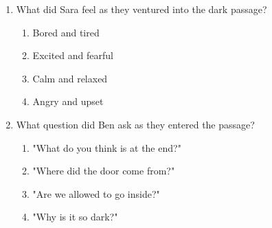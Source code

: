 \documentclass[12pt]{article}
\begin{document}
\begin{enumerate}
    \vspace{0.5cm}

    \item What did Sara feel as they ventured into the dark passage?
    \begin{enumerate}[label=\Alph*.]
        \item Bored and tired
        \item Excited and fearful
        \item Calm and relaxed
        \item Angry and upset
    \end{enumerate}

    \vspace{0.5cm}

    \item What question did Ben ask as they entered the passage?
    \begin{enumerate}[label=\Alph*.]
        \item "What do you think is at the end?"
        \item "Where did the door come from?"
        \item "Are we allowed to go inside?"
        \item "Why is it so dark?"
    \end{enumerate}

\end{enumerate}
\end{document}
